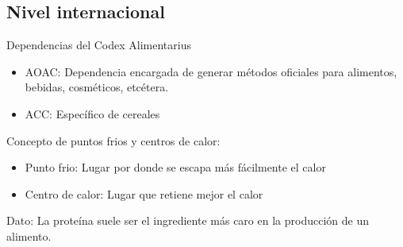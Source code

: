 \subsection{Nivel internacional}

Dependencias del Codex Alimentarius

\begin{itemize}
    \item AOAC: Dependencia encargada de generar métodos oficiales para alimentos, bebidas, cosméticos, etcétera.
    \item ACC: Específico de cereales
\end{itemize}

Concepto de puntos frios y centros de calor:

\begin{itemize}
    \item Punto frio: Lugar por donde se escapa más fácilmente el calor
    \item Centro de calor: Lugar que retiene mejor el calor
\end{itemize}

Dato: La proteína suele ser el ingrediente más caro en la producción de un alimento.
